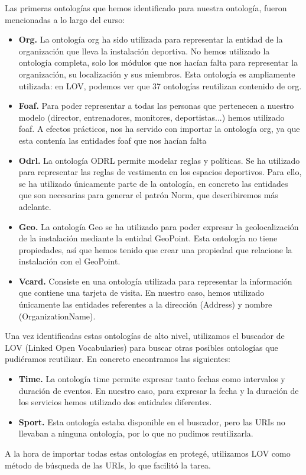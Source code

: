 \documentclass[a4paper,12pt]{article}
\begin{document}
	Las primeras ontologías que hemos identificado para nuestra ontología, fueron mencionadas a lo largo del curso:
	\begin{itemize}
		\item \textbf{Org.} La ontología org ha sido utilizada para representar la entidad de la organización que lleva la instalación deportiva. No hemos utilizado la ontología completa, solo los módulos que nos hacían falta para representar la organización, su localización y sus miembros. Esta ontología es ampliamente utilizada: en LOV, podemos ver que 37 ontologías reutilizan contenido de org.
		\item \textbf{Foaf.} Para poder representar a todas las personas que pertenecen a nuestro modelo (director, entrenadores, monitores, deportistas...) hemos utilizado foaf. A efectos prácticos, nos ha servido con importar la ontología org, ya que esta contenía las entidades foaf que nos hacían falta
		\item \textbf{Odrl.} La ontología ODRL permite modelar reglas y políticas. Se ha utilizado para representar las reglas de vestimenta en los espacios deportivos. Para ello, se ha utilizado únicamente parte de la ontología, en concreto las entidades que son necesarias para generar el patrón Norm, que describiremos más adelante.
		\item \textbf{Geo.} La ontología Geo se ha utilizado para poder expresar la geolocalización de la instalación mediante la entidad GeoPoint. Esta ontología no tiene propiedades, así que hemos tenido que crear una propiedad que relacione la instalación con el GeoPoint. 
		\item \textbf{Vcard.} Consiste en una ontología utilizada para representar la información que contiene una tarjeta de visita. En nuestro caso, hemos utilizado únicamente las entidades referentes a la dirección (Address) y nombre (OrganizationName).
		
	\end{itemize}
	Una vez identificadas estas ontologías de alto nivel, utilizamos el buscador de LOV (Linked Open Vocabularies) para buscar otras posibles ontologías que pudiéramos reutilizar. En concreto encontramos las siguientes:
	
	\begin{itemize}
		\item \textbf{Time.} La ontología time permite expresar tanto fechas como intervalos y duración de eventos. En nuestro caso, para expresar la fecha y la duración de los servicios hemos utilizado dos entidades diferentes.
		\item \textbf{Sport.} Esta ontología estaba disponible en el buscador, pero las URIs no llevaban a ninguna ontología, por lo que no pudimos reutilizarla. 
	\end{itemize}
	A la hora de importar todas estas ontologías en protegé, utilizamos LOV como método de búsqueda de las URIs, lo que facilitó la tarea. 
	
\end{document}
